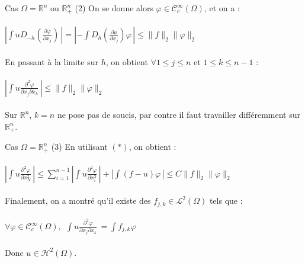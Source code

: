 \documentclass[10pt]{beamer}
\begin{document}
\begin{frame}{Cas $\Omega=\mathbb{R}^n$ ou $\mathbb{R}^n_+$ (2)}
On se donne alors $\varphi \in \mathcal{C}^\infty_c(\Omega)$, et on a : \\~\\

$\displaystyle \left |\int uD_{-h} (\frac{\partial \varphi}{\partial x_j})\, \right | = \displaystyle \left | - \int D_h (\frac{\partial u}{\partial x_j} )\varphi \, \right | \leq \|f\|_2 \|\varphi\|_2 $ \\~\\

En passant à la limite sur $h$, on obtient $\forall 1\leq j \leq n$ et $1 \leq k \leq n-1$ : \\~\\

$\left |\displaystyle \int u \frac{\partial^2 \varphi}{\partial x_j \partial x_k} \, \right | \leq \|f\|_2 \|\varphi\|_2 $ \\~\\

Sur $\mathbb{R}^n$, $k=n$ ne pose pas de soucis, par contre il faut travailler différemment sur $\mathbb{R}^n_+$.
\end{frame}


\begin{frame}{Cas $\Omega=\mathbb{R}^n_+$ (3)}
En utilisant $(*)$, on obtient : \\~\\

$\left |\displaystyle \int u \frac{\partial^2 \varphi}{\partial x_N^2} \, \right | \leq \displaystyle \sum_{i=1}^{n-1} \left |\displaystyle \int u \frac{\partial^2 \varphi}{\partial x_i^2} \, \right | + \left |\displaystyle \int (f-u) \varphi \, \right | \leq C \|f\|_2 \|\varphi\|_2$ \\~\\

Finalement, on a montré qu'il existe des $f_{j,k} \in \mathcal{L}^2(\Omega)$ tels que : \\~\\

$\forall \varphi  \in \mathcal{C}^\infty_c(\Omega), \ \ \displaystyle \int u \frac{\partial^2 \varphi}{\partial x_j  \partial x_k} \, = \displaystyle \int f_{j,k} \varphi \,$ \\~\\

Donc $u\in \mathcal{H}^2(\Omega)$.
\end{frame}
\end{document}
